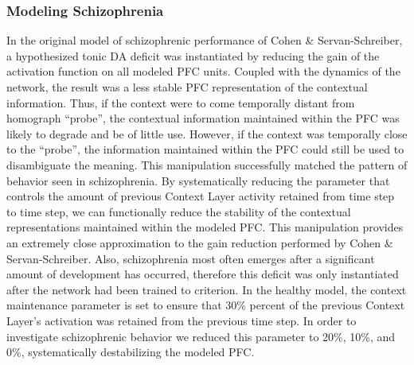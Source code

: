 \subsubsection{Modeling Schizophrenia}
In the original model of schizophrenic performance of Cohen \& Servan-Schreiber, a hypothesized tonic DA deficit was instantiated by reducing the gain of the activation function on all modeled PFC units. Coupled with the dynamics of the network, the result was a less stable PFC representation of the contextual information.  Thus, if the context were to come temporally distant from homograph ``probe'', the contextual information maintained within the PFC was likely to degrade and be of little use.  However, if the context was temporally close to the ``probe'', the information maintained within the PFC could still be used to disambiguate the meaning.  This manipulation successfully matched the pattern of behavior seen in schizophrenia. By systematically reducing the parameter that controls the amount of previous Context Layer activity retained from time step to time step, we can functionally reduce the stability of the contextual representations maintained within the modeled PFC.  This manipulation provides an extremely close approximation to the gain reduction performed by Cohen \& Servan-Schreiber.   Also, schizophrenia most often emerges after a significant amount of development has occurred, therefore this deficit was only instantiated after the network had been trained to criterion.  In the healthy model, the context maintenance parameter is set to ensure that 30\% percent of the previous Context Layer's activation was retained from the previous time step.  In order to investigate schizophrenic behavior we reduced this parameter to 20\%, 10\%, and 0\%, systematically destabilizing the modeled PFC. 
